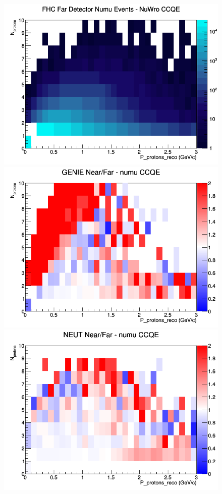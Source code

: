 \begin{figure}[h]
\endminipage
{}
\includegraphics[width=\linewidth]{eff_N_P/GAr/protons/CCQE_FHC_FD_numu_N_P_NuWro.png}
\endminipage
\newline
{}
\includegraphics[width=\linewidth]{eff_N_P/GAr/protons/ratios/CCQE_GENIE_numu_NF_N_P.png}
\endminipage
{}
\includegraphics[width=\linewidth]{eff_N_P/GAr/protons/ratios/CCQE_NEUT_numu_NF_N_P.png}

\end{figure}
